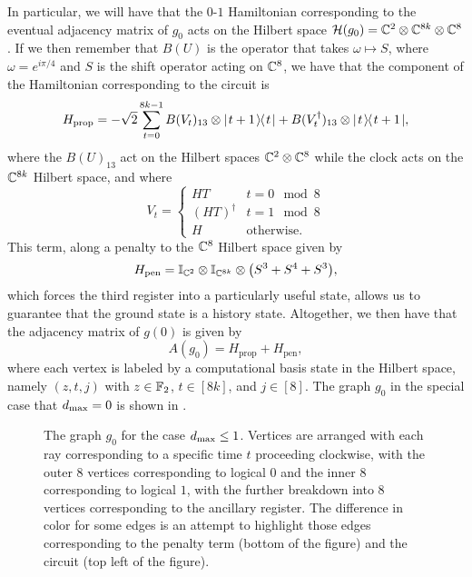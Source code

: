 \documentclass[../thesis-main/thesis-main]{subfiles}
\begin{document}
In particular, we will have that the $0$-$1$ Hamiltonian corresponding to the eventual adjacency matrix of $g_0$ acts on the Hilbert space $\mathcal{H}(g_0) = \mathbb{C}^{2}\otimes \mathbb{C}^{8k} \otimes \mathbb{C}^8$.  If we then remember that $B(U)$ is the operator that takes $\omega \mapsto S$, where $\omega = e^{i \pi/4}$ and  $S$ is the shift operator acting on $\mathbb{C}^{8}$, we have that the component of the Hamiltonian corresponding to the circuit is
\begin{equation}
  H_{\text{prop}} = -\sqrt{2} \sum_{t=0}^{8k-1} B(V_{t})_{13} \otimes |\mspace{2mu} t+1 \mspace{2mu} \rangle\mspace{-2mu}\langle\mspace{2mu} t \mspace{2mu} | + B(V_{t}^\dag)_{13} \otimes |\mspace{2mu} t \mspace{2mu} \rangle\mspace{-2mu}\langle\mspace{2mu} t+1 \mspace{2mu} |,
\end{equation}
where the $B(U)_{13}$ act on the Hilbert spaces $\mathbb{C}^{2}\otimes \mathbb{C}^{8}$ while the clock acts on the $\mathbb{C}^{8k}$ Hilbert space, and where
\begin{equation}
  V_t = \begin{cases}
    HT & t = 0 \mod 8\\
    (HT)^{\dag} & t = 1 \mod 8\\
    H & \text{otherwise}.
  \end{cases}
\end{equation}
This term, along a penalty to the $\mathbb{C}^8$ Hilbert space given by
\begin{equation}
  H_{\text{pen}} = \mathbb{I}_{\mathbb{C}^2} \otimes \mathbb{I}_{\mathbb{C}^{8k}} \otimes \big( S^3 + S^4 + S^3\big),
\end{equation}
which forces the third register into a particularly useful state, allows us to guarantee that the ground state is a history state.  Altogether, we then have that the adjacency matrix of $g(0)$ is given by
\begin{equation}
  A(g_0) = H_{\text{prop}} + H_{\text{pen}},
\end{equation}
where each vertex is labeled by a computational basis state in the Hilbert space, namely $(z,t,j)$ with $z\in \mathbb{F}_2$, $t\in [8k]$, and $j\in[8]$.  The graph $g_0$ in the special case that $d_{\text{max}} = 0$ is shown in .

\begin{figure}
  \centering
  
  \caption[The graph $g_0$]{The graph $g_{0}$ for the case $d_{\text{max}} \leq 1$.  Vertices are arranged with each ray corresponding to a specific time $t$ proceeding clockwise, with the outer 8 vertices corresponding to logical $0$ and the inner 8 corresponding to logical $1$, with the further breakdown into 8 vertices corresponding to the ancillary register.  The difference in color for some edges is an attempt to highlight those edges corresponding to the penalty term (bottom of the figure) and the circuit (top left of the figure).  \label{fig:g_0}}
\end{figure}
\end{document}
